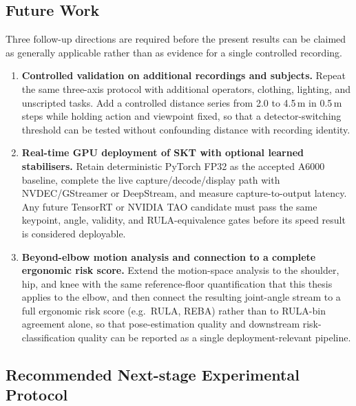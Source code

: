 \documentclass[12pt,a4paper]{article}
\begin{document}
\subsection{Future Work}

Three follow-up directions are required before the present results can
be claimed as generally applicable rather than as evidence for a single
controlled recording.

\begin{enumerate}[leftmargin=1.2cm]
  \item \textbf{Controlled validation on additional recordings and subjects.}
        Repeat the same three-axis protocol with additional operators,
        clothing, lighting, and unscripted tasks.  Add a controlled
        distance series from 2.0 to 4.5\,m in 0.5\,m steps while holding
        action and viewpoint fixed, so that a detector-switching threshold
        can be tested without confounding distance with recording identity.
  \item \textbf{Real-time GPU deployment of SKT with optional learned
        stabilisers.} Retain deterministic PyTorch FP32 as the accepted
        A6000 baseline, complete the live capture/decode/display path with
        NVDEC/GStreamer or DeepStream, and measure capture-to-output
        latency.  Any future TensorRT or NVIDIA TAO candidate must pass the
        same keypoint, angle, validity, and RULA-equivalence gates before
        its speed result is considered deployable.
  \item \textbf{Beyond-elbow motion analysis and connection to a complete
        ergonomic risk score.} Extend the motion-space analysis to the
        shoulder, hip, and knee with the same reference-floor
        quantification that this thesis applies to the elbow, and then
        connect the resulting joint-angle stream to a full ergonomic
        risk score (e.g.\ RULA, REBA) rather than to RULA-bin agreement
        alone, so that pose-estimation quality and downstream
        risk-classification quality can be reported as a single
        deployment-relevant pipeline.
\end{enumerate}

\subsection{Recommended Next-stage Experimental Protocol}
\end{document}
